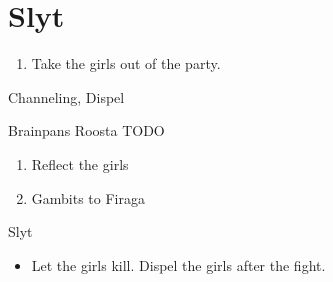 \chapter{Slyt}

\begin{enumerate}
	\item Take the girls out of the party.
\end{enumerate}
\begin{liscense}
	\ashe Channeling, Dispel
\end{liscense}
\begin{battle}{Brainpans}
	Roosta TODO
\end{battle}
\begin{enumerate}
	\item Reflect the girls
	\item Gambits to Firaga
\end{enumerate}
\begin{battle}{Slyt}
	\begin{itemize}
		\item Let the girls kill. Dispel the girls after the fight.
	\end{itemize}
\end{battle}